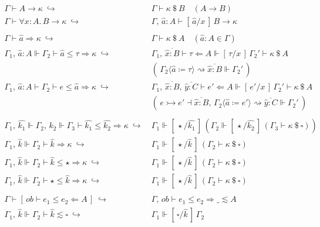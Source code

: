 \documentclass{article}
\newcommand{\acheck}[3]{#1 \le #2 \Leftarrow #3}
\newcommand{\scheck}[2]{#1 \Leftarrow #2}
\newcommand{\ainfer}[3][\kappa]{#2 \le #3 \Rightarrow #1}
\newcommand{\sinfer}[2][\kappa]{#2 \Rightarrow #1}
\newcommand{\reduce}[2][\kappa]{#2 \longrightarrow #1}
\newcommand{\compact}[2]{#1 \lesssim #2}
\newcommand{\capp}[2][\kappa]{#1 ~\$~ #2}
\newcommand{\kvar}{\hat{k}}
\newcommand{\kvarn}[2][k]{\hat{#1_{#2}}}
\newcommand{\wlred}{~\hookrightarrow~ &}
\newcommand{\aforall}[3][x]{\forall #1 : #2.\, #3}
\newcommand{\ex}[1][a]{\hat{#1}}
\newcommand{\exb}[2][a]{\hat{#1} : #2}
\newcommand{\subst}[3][x]{[\,#2 / #1\,]\,#3}
\newcommand{\ksubst}[3][k]{\subst[\hat{#1}]{#2}{#3}}
\newcommand{\reorder}[5]{#1\langle#2 \coloneqq #3 \rangle \rightsquigarrow \overline{#4} \Vdash #5}
\begin{document}
\begin{align*}
    \\
    \Gamma \vdash \reduce{A} \wlred \Gamma \vdash \capp{B} \quad (A \longrightarrow B) \\
    \Gamma \vdash \reduce{\aforall{A}{B}} \wlred \Gamma ,\, \exb{A} \vdash \reduce{\subst{\ex}{B}} \\
    \\
    \Gamma \vdash \sinfer{\ex} \wlred \Gamma \vdash \capp{A} \quad (\exb{A} \in \Gamma) \\
    \Gamma_1 ,\, \exb{A} \Vdash \Gamma_2 \vdash \ainfer{\ex}{\tau} \wlred
        \Gamma_1 ,\, \overline{\ex[x] : B} \vdash \scheck{\tau}{A} \Vdash \subst{\tau}{\Gamma_2'}
        \vdash \capp{A}
        \\ & (\, \reorder{\Gamma_2}{\ex}{\tau}{\exb[x]{B}}{\Gamma_2'} \,) \\
    \Gamma_1 ,\, \exb{A} \vdash \Gamma_2 \vdash \ainfer{e}{\ex} \wlred
        \Gamma_1 ,\, \overline{\ex[x] : B} ,\, \overline{\ex[y] : C} \vdash \scheck{e'}{A} \Vdash \subst{e'}{\Gamma_2'}
        \vdash \capp{A}
        \\ & (\, e \rightarrowtail e' \dashv \overline{\exb[x]{B}}
        ,\, \reorder{\Gamma_2}{\ex}{e'}{\exb[y]{C}}{\Gamma_2'} \,) \\
    \\
    \Gamma_1 ,\, \kvarn{1} \Vdash \Gamma_2 ,\, \kvarn{2} \Vdash \Gamma_3 \vdash \ainfer{\kvarn{1}}{\kvarn{2}} \wlred
        \Gamma_1 \Vdash \ksubst[k_1]{\star}{(\Gamma_2 \Vdash \ksubst[k_2]{\star}{(\Gamma_3 \vdash \capp{\square})})}
    \\
    \Gamma_1 ,\, \kvar \Vdash \Gamma_2 \vdash \sinfer{\kvar} \wlred
        \Gamma_1 \Vdash \ksubst{\star}{(\Gamma_2 \vdash \capp{\square})}  \\
    \Gamma_1 ,\, \kvar \Vdash \Gamma_2 \vdash \ainfer{\kvar}{\star} \wlred
        \Gamma_1 \Vdash \ksubst{\star}{(\Gamma_2 \vdash \capp{\square})}  \\
    \Gamma_1 ,\, \kvar \Vdash \Gamma_2 \vdash \ainfer{\star}{\kvar} \wlred
        \Gamma_1 \Vdash \ksubst{\star}{(\Gamma_2 \vdash \capp{\square})}  \\
    \\
    \Gamma \vdash [\, ob \vdash \acheck{e_1}{e_2}{A} \,] \wlred
        \Gamma ,\, ob \vdash \ainfer[\compact{\_}{A}]{e_1}{e_2} \\
    \Gamma_1 ,\, \kvar \Vdash \Gamma_2 \vdash \compact{\kvar}{\square} \wlred
        \Gamma_1 \Vdash \ksubst{\square}{\Gamma_2}  \\

\end{align*}
\end{document}
